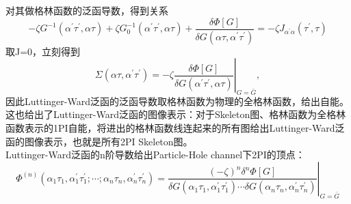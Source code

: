 \documentclass[10pt,openany]{book}
\theoremstyle{thmstyle} %
\theoremstyle{defstyle} %
\theoremstyle{prostyle} %
\begin{document}
对其做格林函数的泛函导数，得到关系
\begin{equation*}
  -\zeta G^{-1}\left(\alpha^{\prime} \tau^{\prime}, \alpha \tau\right)+\zeta G_0^{-1}\left(\alpha^{\prime} \tau^{\prime}, \alpha \tau\right)+\frac{\delta \Phi[G]}{\delta G\left(\alpha \tau, \alpha^{\prime} \tau^{\prime}\right)}=-\zeta J_{\alpha^{\prime} \alpha}\left(\tau^{\prime}, \tau\right)
\end{equation*}
取J=0，立刻得到
\begin{equation}
  \Sigma\left(\alpha \tau, \alpha^{\prime} \tau^{\prime}\right)=-\left.\zeta \frac{\delta \Phi[G]}{\delta G\left(\alpha^{\prime} \tau^{\prime}, \alpha \tau\right)}\right|_{G=\bar{G}},
\end{equation}
因此Luttinger-Ward泛函的泛函导数取格林函数为物理的全格林函数，给出自能。这也给出了Luttinger-Ward泛函的图像表示：对于Skeleton图、格林函数为全格林函数表示的1PI自能，将进出的格林函数线连起来的所有图给出Luttinger-Ward泛函的图像表示，也就是所有2PI Skeleton图。\\
Luttinger-Ward泛函的n阶导数给出Particle-Hole channel下2PI的顶点：
\begin{equation*}
  \Phi^{(n)}\left(\alpha_1 \tau_1, \alpha_1^{\prime} \tau_1^{\prime} ; \cdots ; \alpha_n \tau_n, \alpha_n^{\prime} \tau_n^{\prime}\right)=\left.\frac{(-\zeta)^n \delta^n \Phi[G]}{\delta G\left(\alpha_1 \tau_1, \alpha_1^{\prime} \tau_1^{\prime}\right) \cdots \delta G\left(\alpha_n \tau_n, \alpha_n^{\prime} \tau_n^{\prime}\right)}\right|_{G=\bar{G}}
\end{equation*}
\end{document}
